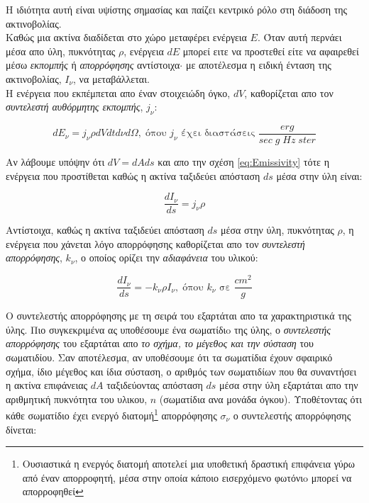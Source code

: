 Η ιδιότητα αυτή είναι υψίστης σημασίας και παίζει κεντρικό ρόλο στη διάδοση της ακτινοβολίας.\\

Καθώς μια ακτίνα διαδίδεται στο χώρο μεταφέρει ενέργεια $Ε$. Όταν αυτή περνάει μέσα απο ύλη, πυκνότητας $\rho$, ενέργεια $dE$ μπορεί ειτε να προστεθεί είτε να αφαιρεθεί μέσω {\it εκπομπής} ή {\it απορρόφησης} αντίστοιχα$\cdot$ με αποτέλεσμα η ειδική ένταση της ακτινοβολίας, $I_{\nu}$, να μεταβάλλεται.\\

Η ενέργεια που εκπέμπεται απο έναν στοιχειώδη όγκο, $dV$, καθορίζεται απο τον {\it συντελεστή αυθόρμητης εκπομπής}, $j_{\nu}$:

\begin{equation}\label{eq:Emissivity}
  dE_{\nu} = j_{\nu}\rho dVdtd\nu d\Omega , \; \text{όπου $j_{\nu}$ έχει διαστάσεις} \; \frac{erg}{sec \; g \; Hz \; ster}  
\end{equation}

Aν λάβουμε υπόψην ότι $dV=dAds$ και απο την σχέση \eqref{eq:Emissivity} τότε η ενέργεια που προστίθεται καθώς η ακτίνα ταξιδεύει απόσταση $ds$ μέσα στην ύλη είναι:

\begin{equation}\label{eq:Emissivity2}
  \frac{dI_{\nu}}{ds}=j_\nu \rho
\end{equation}

Αντίστοιχα, καθώς η ακτίνα ταξιδεύει απόσταση $ds$ μέσα στην ύλη, πυκνότητας $\rho$, η ενέργεια που χάνεται λόγο απορρόφησης καθορίζεται απο τον {\it συντελεστή απορρόφησης}, $k_{\nu}$, ο οποίος ορίζει την {\it αδιαφάνεια} του υλικού:

\begin{equation}\label{eq:Absorption1}
  \frac{dI_{\nu}}{ds}=-k_{\nu}\rho I_\nu, \; \text{όπου $k_{\nu}$ σε $\frac{cm^2}{g}$}
\end{equation}

Ο συντελεστής απορρόφησης με τη σειρά του εξαρτάται απο τα χαρακτηριστικά της ύλης. Πιο συγκεκριμένα ας υποθέσουμε ένα σωματίδιo της ύλης, ο {\it συντελεστής απορρόφησης} του εξαρτάται απο {\it το σχήμα, το μέγεθος και την σύσταση} του σωματιδίου. Σαν αποτέλεσμα, αν υποθέσουμε ότι τα σωματίδια έχουν σφαιρικό σχήμα, ίδιο μέγεθος και ίδια σύσταση, ο αριθμός των σωματιδίων που θα συναντήσει η ακτίνα επιφάνειας $dA$ ταξιδεύοντας απόσταση $ds$ μέσα στην ύλη εξαρτάται απο την αριθμητική πυκνότητα του υλικου, $n$ (σωματίδια ανα μονάδα όγκου). Υποθέτοντας ότι κάθε σωματίδιο έχει ενεργό διατομή\footnote{Ουσιαστικά η ενεργός διατομή αποτελεί μια υποθετική δραστική επιφάνεια γύρω από έναν απορροφητή, μέσα στην οποία κάποιο εισερχόμενο φωτόνιo μπορεί να απορροφηθεί} απορρόφησης $\sigma_{\nu}$  ο συντελεστής απορρόφησης δίνεται:

